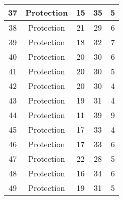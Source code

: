 \documentclass[results.tex]{subfiles}
\begin{document}
\begin{center}
\begin{tabular}{| c || c | c | c | c |}
            \hline
            37                      & Protection                   & 15                     & 35                      & 5                    \\
            \hline
            38                      & Protection                   & 21                     & 29                      & 6                    \\
            \hline
            39                      & Protection                   & 18                     & 32                      & 7                    \\
            \hline
            40                      & Protection                   & 20                     & 30                      & 6                    \\
            \hline
            41                      & Protection                   & 20                     & 30                      & 5                    \\
            \hline
            42                      & Protection                   & 20                     & 30                      & 4                    \\
            \hline
            43                      & Protection                   & 19                     & 31                      & 4                    \\
            \hline
            44                      & Protection                   & 11                     & 39                      & 9                    \\
            \hline
            45                      & Protection                   & 17                     & 33                      & 4                    \\
            \hline
            46                      & Protection                   & 17                     & 33                      & 6                    \\
            \hline
            47                      & Protection                   & 22                     & 28                      & 5                    \\
            \hline
            48                      & Protection                   & 16                     & 34                      & 6                    \\
            \hline
            49                      & Protection                   & 19                     & 31                      & 5                    \\
            \hline
        \end{tabular}
    \end{center}
\end{document}
